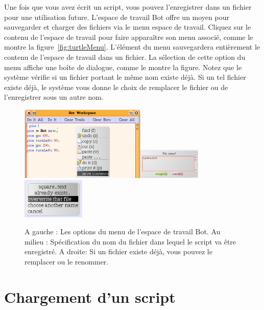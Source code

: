 \documentclass[a4paper,10pt,twoside]{book}
\begin{document}
Une fois que vous avez \'ecrit un script, vous pouvez l'enregistrer dans un fichier pour une utilisation future. L'espace de travail Bot offre un moyen pour sauvegarder et charger des fichiers via le menu espace de travail. Cliquez sur le contenu de l'espace de travail pour faire appara\^itre son menu associ\'e, comme le montre la figure~\ref{fig:turtleMenu}. L'\'el\'ement  du menu sauvegardera enti\`erement le contenu  de l'espace de travail dans un fichier. La s\'election de cette option du menu affiche une bo\^ite de dialogue, comme le montre la figure. Notez que le syst\`eme v\'erifie si un fichier portant le m\^eme nom existe d\'ej\`a. Si un tel fichier existe d\'ej\`a, le syst\`eme vous donne le choix de remplacer le fichier ou de l'enregistrer sous un autre nom. 

\begin{figure}[h]
\includegraphics[width=6cm]{saveContents}\includegraphics[width=3cm]{enteringFileName}\includegraphics[width=3cm]{overwrite}
\caption{A gauche : Les options du menu de l'espace de travail Bot. Au milieu :  Sp\'ecification du nom du fichier dans lequel le script va \^etre enregistr\'e. A droite: Si un fichier existe d\'ej\`a, vous pouvez le remplacer ou le renommer. \label{fig:turtleMenu} \label{fig:enteringFileName}}
\end{figure}


\section{Chargement d'un script }
\end{document}
